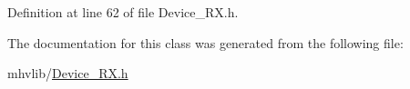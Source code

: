 Definition at line 62 of file Device\-\_\-\-R\-X.\-h.



The documentation for this class was generated from the following file\-:\begin{DoxyCompactItemize}
\item 
mhvlib/\hyperlink{_device___r_x_8h}{Device\-\_\-\-R\-X.\-h}\end{DoxyCompactItemize}
